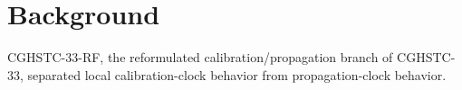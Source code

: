 \section{Background}

CGHSTC-33-RF, the reformulated calibration/propagation branch of CGHSTC-33,
separated local calibration-clock behavior from propagation-clock behavior.
